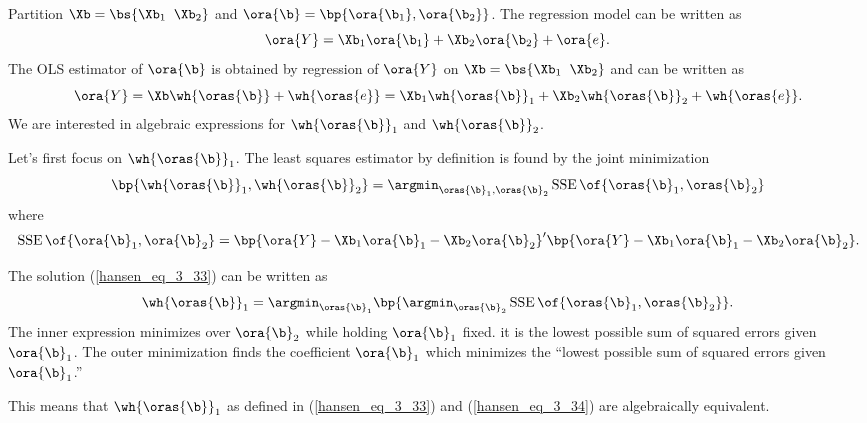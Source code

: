 Partition $\Xb = \bs{\Xb_1\;\; \Xb_2}$ and $\ora{\b} = \bp{\ora{\b_1}, \ora{\b_2}}$. The regression model can be written as 
\begin{equation}
    \label{hansen_eq_3_31}
    \ora{Y} = \Xb_1 \ora{\b_1} + \Xb_2 \ora{\b_2} + \ora{e}.
\end{equation}
The OLS estimator of $\ora{\b}$ is obtained by regression of $\ora{Y}$ on $\Xb = \bs{\Xb_1\;\; \Xb_2}$ and can be written as 
\begin{equation}
    \label{hansen_eq_3_32}
    \ora{Y} = \Xb \wh{\oras{\b}} + \wh{\oras{e}} = \Xb_1 \wh{\oras{\b}}_1 + \Xb_2 \wh{\oras{\b}}_2 + \wh{\oras{e}}.
\end{equation}
We are interested in algebraic expressions for $\wh{\oras{\b}}_1$ and $\wh{\oras{\b}}_2$.

Let's first focus on $\wh{\oras{\b}}_1$. The least squares estimator by definition is found by the joint minimization
\begin{equation}
    \label{hansen_eq_3_33}
    \bp{\wh{\oras{\b}}_1, \wh{\oras{\b}}_2} = \argmin_{\oras{\b}_1, \oras{\b}_2} \operatorname*{SSE}\of{\oras{\b}_1, \oras{\b}_2}
\end{equation}
where 
\begin{equation}
    \notag
    \operatorname*{SSE}\of{\ora{\b}_1, \ora{\b}_2} = \bp{\ora{Y} - \Xb_1 \ora{\b}_1 - \Xb_2 \ora{\b}_2}^\prime \bp{\ora{Y} - \Xb_1 \ora{\b}_1 - \Xb_2 \ora{\b}_2}.
\end{equation}

The solution (\ref{hansen_eq_3_33}) can be written as 
\begin{equation}
    \label{hansen_eq_3_34}
    \wh{\oras{\b}}_1 = \argmin_{\oras{\b}_1} \bp{\argmin_{\oras{\b}_2} \operatorname*{SSE}\of{\oras{\b}_1, \oras{\b}_2}}.
\end{equation}
The inner expression minimizes over $\ora{\b}_2$ while holding $\ora{\b}_1$ fixed. it is the lowest possible sum of squared errors given $\ora{\b}_1$. The outer minimization finds the coefficient $\ora{\b}_1$ which minimizes the ``lowest possible sum of squared errors given $\ora{\b}_1$.'' 

This means that $\wh{\oras{\b}}_1$ as defined in (\ref{hansen_eq_3_33}) and (\ref{hansen_eq_3_34}) are algebraically equivalent.

